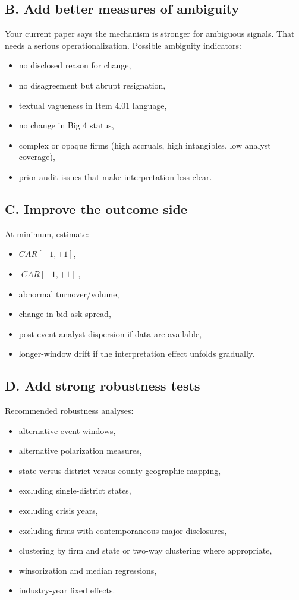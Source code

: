 \documentclass[12pt]{article}
\begin{document}
\subsection{B. Add better measures of ambiguity}
Your current paper says the mechanism is stronger for ambiguous signals. That needs a serious operationalization. Possible ambiguity indicators:
\begin{itemize}[leftmargin=2em]
    \item no disclosed reason for change,
    \item no disagreement but abrupt resignation,
    \item textual vagueness in Item 4.01 language,
    \item no change in Big 4 status,
    \item complex or opaque firms (high accruals, high intangibles, low analyst coverage),
    \item prior audit issues that make interpretation less clear.
\end{itemize}

\subsection{C. Improve the outcome side}
At minimum, estimate:
\begin{itemize}[leftmargin=2em]
    \item $CAR[-1,+1]$,
    \item $|CAR[-1,+1]|$,
    \item abnormal turnover/volume,
    \item change in bid-ask spread,
    \item post-event analyst dispersion if data are available,
    \item longer-window drift if the interpretation effect unfolds gradually.
\end{itemize}

\subsection{D. Add strong robustness tests}
Recommended robustness analyses:
\begin{itemize}[leftmargin=2em]
    \item alternative event windows,
    \item alternative polarization measures,
    \item state versus district versus county geographic mapping,
    \item excluding single-district states,
    \item excluding crisis years,
    \item excluding firms with contemporaneous major disclosures,
    \item clustering by firm and state or two-way clustering where appropriate,
    \item winsorization and median regressions,
    \item industry-year fixed effects.
\end{itemize}
\end{document}
